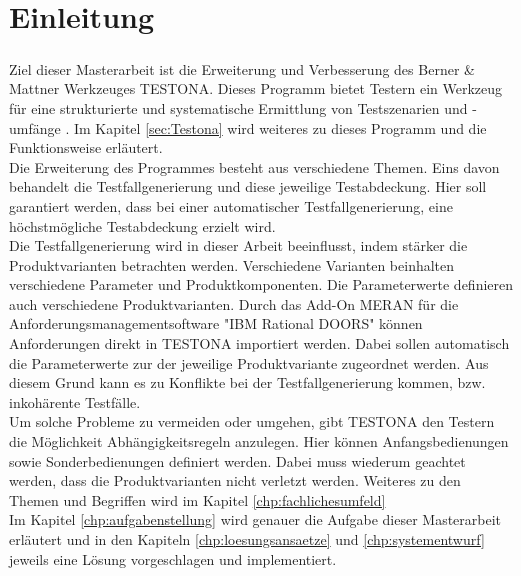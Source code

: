 \chapter{Einleitung}\label{chp:einleitung}
\paragraph{}
Ziel dieser Masterarbeit ist die Erweiterung und Verbesserung des Berner \& Mattner Werkzeuges TESTONA. Dieses Programm bietet Testern ein Werkzeug für eine strukturierte und systematische Ermittlung von Testszenarien und -umfänge \cite{TESTONA}. Im Kapitel \ref{sec:Testona} wird weiteres zu dieses Programm und die Funktionsweise erläutert.\\

Die Erweiterung des Programmes besteht aus verschiedene Themen. Eins davon behandelt die Testfallgenerierung und diese jeweilige Testabdeckung. Hier soll garantiert werden, dass bei einer automatischer Testfallgenerierung, eine höchstmögliche Testabdeckung erzielt wird.\\

Die Testfallgenerierung wird in dieser Arbeit beeinflusst, indem stärker die Produktvarianten betrachten werden. Verschiedene Varianten beinhalten verschiedene Parameter und Produktkomponenten. Die Parameterwerte definieren auch verschiedene Produktvarianten. Durch das Add-On MERAN für die Anforderungsmanagementsoftware "IBM Rational DOORS" können Anforderungen direkt in  TESTONA importiert werden. Dabei sollen automatisch die Parameterwerte zur der jeweilige Produktvariante zugeordnet werden. Aus diesem Grund kann es zu Konflikte bei der Testfallgenerierung kommen, bzw. inkohärente Testfälle.\\

Um solche Probleme zu vermeiden oder umgehen, gibt TESTONA den Testern die Möglichkeit Abhängigkeitsregeln anzulegen. Hier können Anfangsbedienungen sowie Sonderbedienungen definiert werden. Dabei muss wiederum geachtet werden, dass die Produktvarianten nicht verletzt werden. Weiteres zu den Themen und Begriffen wird im Kapitel \ref{chp:fachlichesumfeld}\\

Im Kapitel \ref{chp:aufgabenstellung} wird genauer die Aufgabe dieser Masterarbeit erläutert und in den Kapiteln \ref{chp:loesungsansaetze} und \ref{chp:systementwurf} jeweils eine Lösung vorgeschlagen und implementiert.

